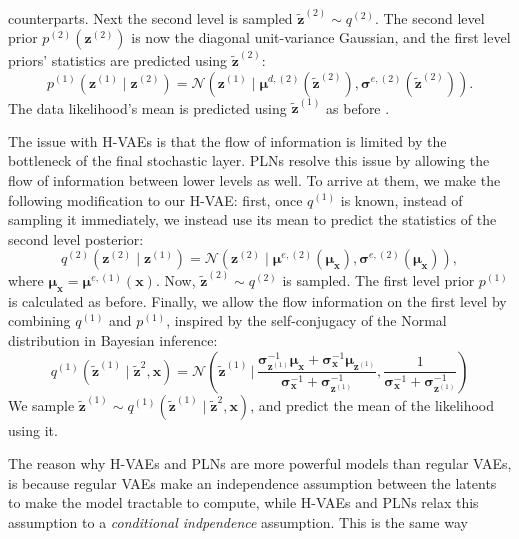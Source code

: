 \documentclass{article}
\renewcommand{\vec}[1]{\mathbf{#1}}
\newcommand{\Norm}[1]{\mathcal{N}\left( #1 \right)}
\newcommand{\MU}{\boldsymbol\mu}
\newcommand{\SIGMA}{\boldsymbol\sigma}
\begin{document}
counterparts. Next the second level is sampled $\vec{\tilde{z}}^{(2)} \sim
q^{(2)}$. The second level prior $p^{(2)}(\vec{z}^{(2)})$ is now the diagonal
unit-variance Gaussian, and the first level priors' statistics are predicted
using $\vec{\tilde{z}}^{(2)}$:
\[
  p^{(1)}(\vec{z}^{(1)} \mid \vec{z}^{(2)}) =
  \Norm{\vec{z}^{(1)} \mid \MU^{d, (2)}(\vec{\tilde{z}}^{(2)}),
    \SIGMA^{e, (2)}(\vec{\tilde{z}}^{(2)})}.
\] 
The data likelihood's mean is predicted using $\vec{\tilde{z}}^{(1)}$ as before
\cite{sonderby2016train}.
\par
The issue with H-VAEs is that the flow of information is limited by the
bottleneck of the final stochastic layer. PLNs resolve this issue by allowing
the flow of information between lower levels as well. To arrive at them, we
make the following modification to our H-VAE: first, once $q^{(1)}$ is known,
instead of sampling it immediately, we instead use its mean to predict the
statistics of the second level posterior:
\[
  q^{(2)}(\vec{z}^{(2)} \mid \vec{z}^{(1)}) = \Norm{\vec{z}^{(2)} \mid 
  \MU^{e, (2)}(\MU_{\vec{x}}), \SIGMA^{e, (2)}(\MU_{\vec{x}})},
\]
where $\MU_{\vec{x}} = \MU^{e, (1)}(\vec{x})$. Now, $\vec{\tilde{z}}^{(2)} \sim
q^{(2)}$ is sampled. The first level prior $p^{(1)}$ is calculated as before.
Finally, we allow the flow information on the first level by combining $q^{(1)}$
and $p^{(1)}$, inspired by the self-conjugacy of the Normal distribution in
Bayesian inference\footnotemark:
\[
  q^{(1)}(\vec{\tilde{z}}^{(1)} \mid \vec{\tilde{z}}^{2}, \vec{x}) =
  \Norm{\vec{\tilde{z}}^{(1)} \,\bigg|\,
    \frac{\SIGMA_{\vec{z}^{(1)}}^{-1} \MU_{\vec{x}} + \SIGMA_{\vec{x}}^{-1}
      \MU_{\vec{z}^{(1)}}}{\SIGMA_{\vec{x}}^{-1} + \SIGMA_{\vec{z}^{(1)}}^{-1}
    },
  \frac{1}{\SIGMA_{\vec{x}}^{-1} + \SIGMA_{\vec{z}^{(1)}}^{-1} }}
\]
We sample $\vec{\tilde{z}}^{(1)} \sim q^{(1)}(\vec{\tilde{z}}^{(1)} \mid
\vec{\tilde{z}}^{2}, \vec{x})$, and predict the mean of the likelihood using it.
\par 
The reason why H-VAEs and PLNs are more powerful models than regular VAEs, is
because regular VAEs make an independence assumption between the latents to make
the model tractable to compute, while H-VAEs and PLNs relax this assumption to a
\textit{conditional indpendence} assumption. This is the same way
\cite{balle2018variational} 
\end{document}
